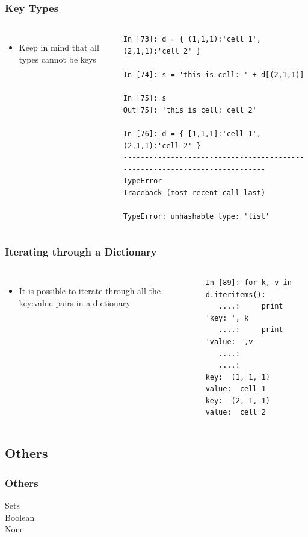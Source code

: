 \documentclass{beamer}
\begin{document}
\begin{frame}[fragile]
\frametitle{Key Types}
\begin{columns}[c]
\column{2.5in}
\begin{itemize}
\item{Keep in mind that all types cannot be keys}
\end{itemize}

\column{2.5in}
\begin{lstlisting}
In [73]: d = { (1,1,1):'cell 1', (2,1,1):'cell 2' }

In [74]: s = 'this is cell: ' + d[(2,1,1)]

In [75]: s
Out[75]: 'this is cell: cell 2'

In [76]: d = { [1,1,1]:'cell 1', (2,1,1):'cell 2' }
---------------------------------------------------------------------------
TypeError                                 Traceback (most recent call last)

TypeError: unhashable type: 'list'

\end{lstlisting}
\end{columns}
\end{frame}


\begin{frame}[fragile]
\frametitle{Iterating through a Dictionary}
\begin{columns}[c]
\column{2.5in}
\begin{itemize}
\item{It is possible to iterate through all the key:value pairs in a dictionary}
\end{itemize}

\column{2.5in}
\begin{lstlisting}
In [89]: for k, v in d.iteritems():
   ....:     print 'key: ', k
   ....:     print 'value: ',v
   ....:
   ....:
key:  (1, 1, 1)
value:  cell 1
key:  (2, 1, 1)
value:  cell 2
\end{lstlisting}
\end{columns}
\end{frame}



\subsection{Others}
\begin{frame}[fragile]
\frametitle{Others}
Sets\\
Boolean\\
None
\end{frame}
\end{document}
